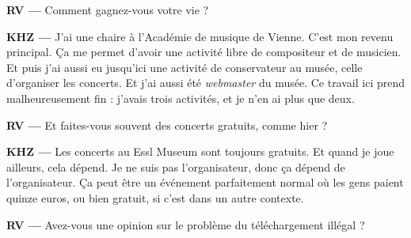 \documentclass[a4paper,12pt]{article}
\begin{document}
\textbf{RV ---} Comment gagnez-vous votre vie ?

\textbf{KHZ ---} J'ai une chaire à l'Académie de musique de Vienne. C'est mon revenu principal. Ça me permet d'avoir une activité libre de compositeur et de musicien. Et puis j'ai aussi eu jusqu'ici une activité de conservateur au musée, celle d'organiser les concerts. Et j'ai aussi été \emph{webmaster} du musée. Ce travail ici prend malheureusement fin : j'avais trois activités, et je n'en ai plus que deux.

\textbf{RV ---} Et faites-vous souvent des concerts gratuits, comme hier ?

\textbf{KHZ ---} Les concerts au Essl Museum sont toujours gratuits. Et quand je joue ailleurs, cela dépend. Je ne suis pas l'organisateur, donc ça dépend de l'organisateur. Ça peut être un événement parfaitement normal où les gens paient quinze euros, ou bien gratuit, si c'est dans un autre contexte.

\textbf{RV ---} Avez-vous une opinion sur le problème du téléchargement illégal ?
\end{document}
